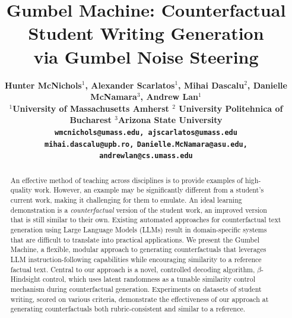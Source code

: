 \documentclass[11pt]{article}
\title{Gumbel Machine: Counterfactual Student Writing Generation\\via Gumbel Noise Steering}
\author{
\bf
Hunter McNichols$^{1}$,
Alexander Scarlatos$^{1}$,
Mihai Dascalu$^{2}$,
Danielle McNamara$^{3}$,
Andrew Lan$^{1}$ \\
$^{1}$University of Massachusetts Amherst $^{2}$ University Politehnica of Bucharest 
$^{3}$Arizona State University \\
\texttt{wmcnichols@umass.edu, ajscarlatos@umass.edu} \\
\texttt{mihai.dascalu@upb.ro,} 
\texttt{Danielle.McNamara@asu.edu,}
\texttt{andrewlan@cs.umass.edu}
}
\begin{document}
\maketitle
\begin{abstract}
An effective method of teaching across disciplines is to provide examples of high-quality work.
However, an example may be significantly different from a student's current work, making it challenging for them to emulate. An ideal learning demonstration is a \textit{counterfactual} version of the student work, an improved version that is still similar to their own.
Existing automated approaches for counterfactual text generation using Large Language Models (LLMs) result in domain-specific systems that are difficult to translate into practical applications.
We present the Gumbel Machine, a flexible, modular approach to generating counterfactuals that leverages LLM instruction-following capabilities while encouraging similarity to a reference factual text.  
Central to our approach is a novel, controlled decoding algorithm, $\beta$-Hindsight control, which uses latent randomness as a tunable similarity control mechanism during counterfactual generation.
Experiments on datasets of student writing, scored on various criteria, demonstrate the effectiveness of our approach at generating counterfactuals both rubric-consistent and similar to a reference.



\end{abstract}
\end{document}

